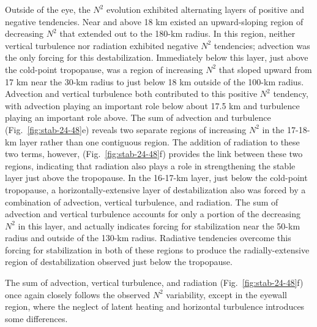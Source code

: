 Outside of the eye, the $N^2$ evolution exhibited alternating layers of positive and negative tendencies.
Near and above 18 km existed an upward-sloping region of decreasing $N^2$ that extended out to the 180-km radius.
In this region, neither vertical turbulence nor radiation exhibited negative $N^2$ tendencies; advection was the only forcing for this destabilization.
Immediately below this layer, just above the cold-point tropopause, was a region of increasing $N^2$ that sloped upward from 17 km near the 30-km radius to just below 18 km outside of the 100-km radius.
Advection and vertical turbulence both contributed to this positive $N^2$ tendency, with advection playing an important role below about 17.5 km and turbulence playing an important role above.
The sum of advection and turbulence (Fig.~\ref{fig:stab-24-48}e) reveals two separate regions of increasing $N^2$ in the 17-18-km layer rather than one contiguous region.
The addition of radiation to these two terms, however, (Fig.~\ref{fig:stab-24-48}f) provides the link between these two regions, indicating that radiation also plays a role in strengthening the stable layer just above the tropopause.
In the 16-17-km layer, just below the cold-point tropopause, a horizontally-extensive layer of destabilization also was forced by a combination of advection, vertical turbulence, and radiation.
The sum of advection and vertical turbulence accounts for only a portion of the decreasing $N^2$ in this layer, and actually indicates forcing for stabilization near the 50-km radius and outside of the 130-km radius.
Radiative tendencies overcome this forcing for stabilization in both of these regions to produce the radially-extensive region of destabilization observed just below the tropopause.

The sum of advection, vertical turbulence, and radiation (Fig.~\ref{fig:stab-24-48}f) once again closely follows the observed $N^2$ variability, except in the eyewall region, where the neglect of latent heating and horizontal turbulence introduces some differences.

